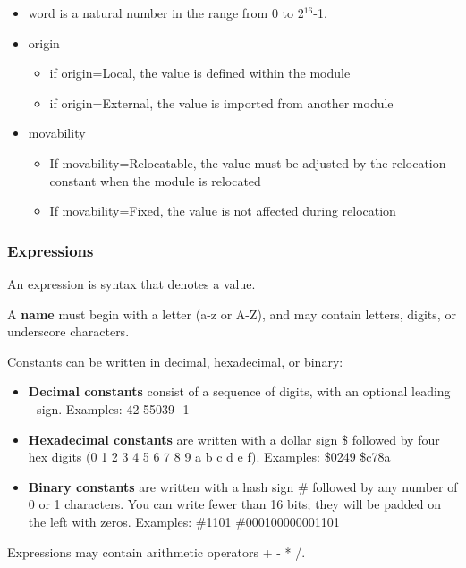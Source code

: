 \documentclass[11pt]{article}
\begin{document}
\begin{itemize}
\item word is a natural number in the range from 0 to 2\(^{\text{16}}\)-1.
\item origin
\begin{itemize}
\item if origin=Local, the value is defined within the module
\item if origin=External, the value is imported from another module
\end{itemize}
\item movability
\begin{itemize}
\item If movability=Relocatable, the value must be adjusted by the
relocation constant when the module is relocated
\item If movability=Fixed, the value is not affected during relocation
\end{itemize}
\end{itemize}

\subsubsection*{Expressions}
\label{sec:org2d81d7f}

An expression is syntax that denotes a value. 

A \textbf{name} must begin with a letter (a-z or A-Z), and may contain
letters, digits, or underscore characters.

Constants can be written in decimal, hexadecimal, or binary:

\begin{itemize}
\item \textbf{Decimal constants} consist of a sequence of digits, with an
optional leading - sign.  Examples: 42 55039 -1

\item \textbf{Hexadecimal constants} are written with a dollar sign \$ followed by
four hex digits (0 1 2 3 4 5 6 7 8 9 a b c d e f).  Examples: \$0249
\$c78a

\item \textbf{Binary constants} are written with a hash sign \# followed by any
number of 0 or 1 characters.  You can write fewer than 16 bits; they
will be padded on the left with zeros.  Examples: \#1101
\#000100000001101
\end{itemize}

Expressions may contain arithmetic operators + - * /.
\end{document}

